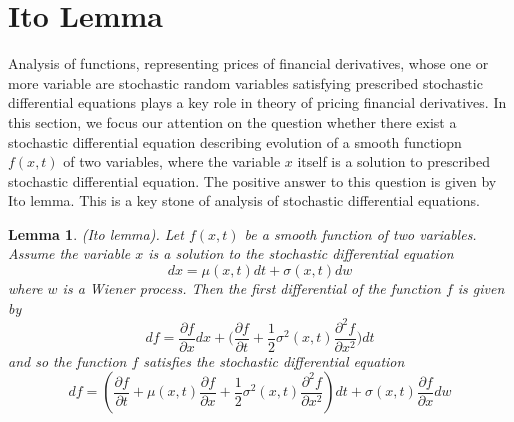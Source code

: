 \documentclass[a4paper]{article}
\newtheorem{lemma}[theorem]{Lemma}
\begin{document}
\section{Ito Lemma}
Analysis of functions, representing prices of financial derivatives, whose one or more variable are stochastic random variables satisfying prescribed stochastic differential equations
plays a key role in theory of pricing financial derivatives. In this section, we focus our attention on the question whether there exist a stochastic differential equation 
describing evolution of a smooth functiopn $f(x,t)$ of two variables, where the variable $x$ itself is a solution to prescribed stochastic differential equation.
The positive answer to this question is given by Ito lemma. This is a key stone of analysis of stochastic differential equations.
\begin{lemma}
    (Ito lemma). Let $f(x,t)$ be a smooth function of two variables. Assume the variable $x$ is a solution to the stochastic differential equation
    \begin{equation}
        dx = \mu(x,t) dt + \sigma(x,t) dw
    \end{equation}
    where $w$ is a Wiener process. Then the first differential of the function $f$ is given by
    \begin{equation}
        df = \frac{\partial f}{\partial x} dx + \bigg( \frac{\partial f}{\partial t} + \frac{1}{2}\sigma^2(x, t) \frac{\partial^2 f}{\partial x^2} \bigg) dt
    \end{equation}
    and so the function $f$ satisfies the stochastic differential equation
    \begin{equation}
        d f=\left(\frac{\partial f}{\partial t}+\mu(x, t) \frac{\partial f}{\partial x}+\frac{1}{2} \sigma^{2}(x, t) \frac{\partial^{2} f}{\partial x^{2}}\right) d t+\sigma(x, t) \frac{\partial f}{\partial x} d w
    \end{equation}
\end{lemma}
\end{document}
